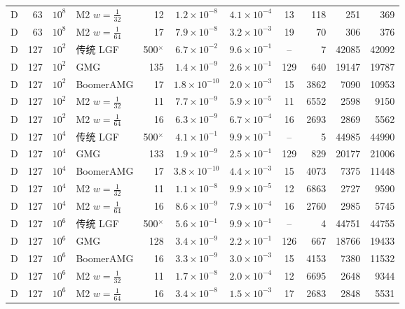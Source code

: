 \begin{longtable}{lrrlrcccrrr}
D & 63 & $10^{8}$ & M2 $w{=}\frac1{32}$ & 12 & $1.2{\times}10^{-8}$ & $4.1{\times}10^{-4}$ & 13 & 118 & 251 & 369 \\
D & 63 & $10^{8}$ & M2 $w{=}\frac1{64}$ & 17 & $7.9{\times}10^{-8}$ & $3.2{\times}10^{-3}$ & 19 & 70 & 306 & 376 \\
D & 127 & $10^{2}$ & 传统 LGF & 500$^\times$ & $6.7{\times}10^{-2}$ & $9.6{\times}10^{-1}$ & -- & 7 & 42085 & 42092 \\
D & 127 & $10^{2}$ & GMG & 135 & $1.4{\times}10^{-9}$ & $2.6{\times}10^{-1}$ & 129 & 640 & 19147 & 19787 \\
D & 127 & $10^{2}$ & BoomerAMG & 17 & $1.8{\times}10^{-10}$ & $2.0{\times}10^{-3}$ & 15 & 3862 & 7090 & 10953 \\
D & 127 & $10^{2}$ & M2 $w{=}\frac1{32}$ & 11 & $7.7{\times}10^{-9}$ & $5.9{\times}10^{-5}$ & 11 & 6552 & 2598 & 9150 \\
D & 127 & $10^{2}$ & M2 $w{=}\frac1{64}$ & 16 & $6.3{\times}10^{-9}$ & $6.7{\times}10^{-4}$ & 16 & 2693 & 2869 & 5562 \\
D & 127 & $10^{4}$ & 传统 LGF & 500$^\times$ & $4.1{\times}10^{-1}$ & $9.9{\times}10^{-1}$ & -- & 5 & 44985 & 44990 \\
D & 127 & $10^{4}$ & GMG & 133 & $1.9{\times}10^{-9}$ & $2.5{\times}10^{-1}$ & 129 & 829 & 20177 & 21006 \\
D & 127 & $10^{4}$ & BoomerAMG & 17 & $3.8{\times}10^{-10}$ & $4.4{\times}10^{-3}$ & 15 & 4073 & 7375 & 11448 \\
D & 127 & $10^{4}$ & M2 $w{=}\frac1{32}$ & 11 & $1.1{\times}10^{-8}$ & $9.9{\times}10^{-5}$ & 12 & 6863 & 2727 & 9590 \\
D & 127 & $10^{4}$ & M2 $w{=}\frac1{64}$ & 16 & $8.6{\times}10^{-9}$ & $7.9{\times}10^{-4}$ & 16 & 2760 & 2985 & 5745 \\
D & 127 & $10^{6}$ & 传统 LGF & 500$^\times$ & $5.6{\times}10^{-1}$ & $9.9{\times}10^{-1}$ & -- & 4 & 44751 & 44755 \\
D & 127 & $10^{6}$ & GMG & 128 & $3.4{\times}10^{-9}$ & $2.2{\times}10^{-1}$ & 126 & 667 & 18766 & 19433 \\
D & 127 & $10^{6}$ & BoomerAMG & 16 & $3.3{\times}10^{-9}$ & $3.0{\times}10^{-3}$ & 15 & 4153 & 7380 & 11532 \\
D & 127 & $10^{6}$ & M2 $w{=}\frac1{32}$ & 11 & $1.7{\times}10^{-8}$ & $2.0{\times}10^{-4}$ & 12 & 6695 & 2648 & 9344 \\
D & 127 & $10^{6}$ & M2 $w{=}\frac1{64}$ & 16 & $3.4{\times}10^{-8}$ & $1.5{\times}10^{-3}$ & 17 & 2683 & 2848 & 5531 \\

\end{longtable}
